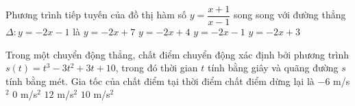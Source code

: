 \begin{ex}%
	Phương trình tiếp tuyến của đồ thị hàm số $y=\dfrac{x+1}{x-1}$ song song với đường thẳng $\Delta \colon y=-2x-1$ là 
	\choice
	{\True $ y=-2x+7 $}
	{$ y=-2x+4 $}
	{$ y=-2x-1 $}
	{$ y=-2x+3 $}
\end{ex}%
\begin{ex}%
Trong một chuyển động thẳng, chất điểm chuyển động xác định bởi phương trình $s(t)=t^3-3t^2+3t+10$, trong đó thời gian $t$ tính bằng giây và quãng đường $s$ tính bằng mét. Gia tốc của chất điểm tại thời điểm chất điểm dừng lại là
\choice
{$-6$ m/s$^2$}
{\True $0$ m/s$^2$}
{$12$ m/s$^2$}
{$10$ m/s$^2$}
\end{ex}%
